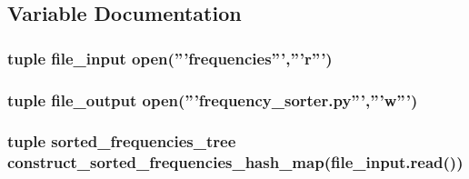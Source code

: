 \subsection{Variable Documentation}
\hypertarget{namespacefrequency__sorter__generator_af10bac427cf4eda50c22bfc352141c53}{
\subsubsection[{file\-\_\-input}]{\setlength{\rightskip}{0pt plus 5cm}tuple file\-\_\-input open('''frequencies''','''r''')}}\label{namespacefrequency__sorter__generator_af10bac427cf4eda50c22bfc352141c53}
\hypertarget{namespacefrequency__sorter__generator_a25e9eabadb6d4f7c84eca83f978cfd4f}{
\subsubsection[{file\-\_\-output}]{\setlength{\rightskip}{0pt plus 5cm}tuple file\-\_\-output open('''frequency\-\_\-sorter.\-py''','''w''')}}\label{namespacefrequency__sorter__generator_a25e9eabadb6d4f7c84eca83f978cfd4f}
\hypertarget{namespacefrequency__sorter__generator_a46abc2f5c61db548b0851ad685b29a49}{
\subsubsection[{sorted\-\_\-frequencies\-\_\-tree}]{\setlength{\rightskip}{0pt plus 5cm}tuple sorted\-\_\-frequencies\-\_\-tree {\bf construct\-\_\-sorted\-\_\-frequencies\-\_\-hash\-\_\-map}(file\-\_\-input.\-read())}}\label{namespacefrequency__sorter__generator_a46abc2f5c61db548b0851ad685b29a49}
